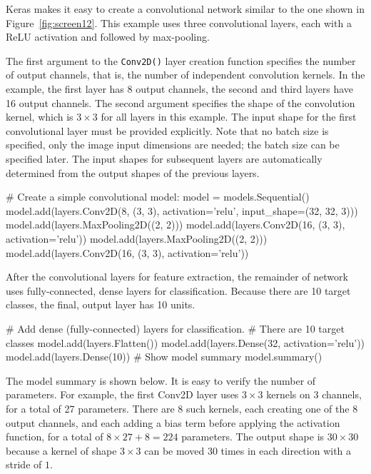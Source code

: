 \begin{withcode}
Keras makes it easy to create a convolutional network similar to the one shown in Figure~\ref{fig:screen12}. This example uses three convolutional layers, each with a ReLU activation and followed by max-pooling. 

The first argument to the \texttt{Conv2D()} layer creation function specifies the number of output channels, that is, the number of independent convolution kernels. In the example, the first layer has 8 output channels, the second and third layers have 16 output channels. The second argument specifies the shape of the convolution kernel, which is $3 \times 3$ for all layers in this example. The input shape for the first convolutional layer must be provided explicitly. Note that no batch size is specified, only the image input dimensions are needed; the batch size can be specified later. The input shapes for subsequent layers are automatically determined from the output shapes of the previous layers.

\begin{pythoncode}
# Create a simple convolutional model:
model = models.Sequential()
model.add(layers.Conv2D(8, (3, 3), activation='relu', 
    input_shape=(32, 32, 3)))
model.add(layers.MaxPooling2D((2, 2)))
model.add(layers.Conv2D(16, (3, 3), activation='relu'))
model.add(layers.MaxPooling2D((2, 2)))
model.add(layers.Conv2D(16, (3, 3), activation='relu'))
\end{pythoncode}

After the convolutional layers for feature extraction, the remainder of network uses fully-connected, dense layers for classification. Because there are 10 target classes, the final, output layer has 10 units.

\begin{pythoncode}
# Add dense (fully-connected) layers for classification. 
# There are 10 target classes
model.add(layers.Flatten())
model.add(layers.Dense(32, activation='relu'))
model.add(layers.Dense(10))
# Show model summary
model.summary()
\end{pythoncode}

The model summary is shown below. It is easy to verify the number of parameters. For example, the first Conv2D layer uses $3 \times 3$ kernels on 3 channels, for a total of 27 parameters. There are 8 such kernels, each creating one of the 8 output channels, and each adding a bias term before applying the activation function, for a total of $8 \times 27 + 8 = 224$ parameters. The output shape is $30 \times 30$ because a kernel of shape $3 \times 3$ can be moved 30 times in each direction with a stride of $1$.


\end{withcode}
